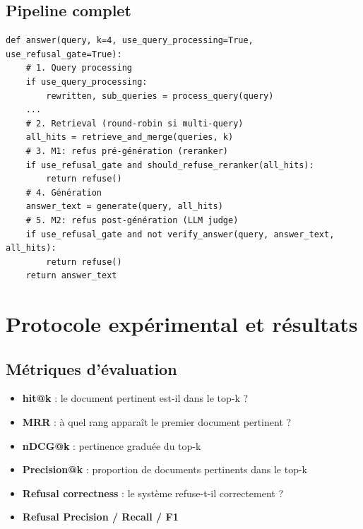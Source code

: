 \documentclass{rapportECL}
\begin{document}
\subsection{Pipeline complet}

\begin{lstlisting}[caption={Fonction principale du pipeline}, label={lst:pipeline}]
def answer(query, k=4, use_query_processing=True, use_refusal_gate=True):
    # 1. Query processing
    if use_query_processing:
        rewritten, sub_queries = process_query(query)
    ...
    # 2. Retrieval (round-robin si multi-query)
    all_hits = retrieve_and_merge(queries, k)
    # 3. M1: refus pré-génération (reranker)
    if use_refusal_gate and should_refuse_reranker(all_hits):
        return refuse()
    # 4. Génération
    answer_text = generate(query, all_hits)
    # 5. M2: refus post-génération (LLM judge)
    if use_refusal_gate and not verify_answer(query, answer_text, all_hits):
        return refuse()
    return answer_text
\end{lstlisting}

\section{Protocole expérimental et résultats}

\subsection{Métriques d'évaluation}

\begin{itemize}
    \item \textbf{hit@k} : le document pertinent est-il dans le top-k ?
    \item \textbf{MRR} : à quel rang apparaît le premier document pertinent ?
    \item \textbf{nDCG@k} : pertinence graduée du top-k
    \item \textbf{Precision@k} : proportion de documents pertinents dans le top-k
    \item \textbf{Refusal correctness} : le système refuse-t-il correctement ?
    \item \textbf{Refusal Precision / Recall / F1}
\end{itemize}
\end{document}
